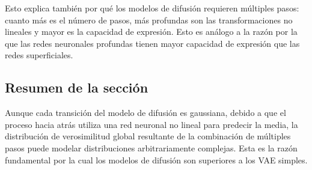 Esto explica también por qué los modelos de difusión requieren múltiples pasos: cuanto más es el número de pasos, más profundas son las transformaciones no lineales y mayor es la capacidad de expresión. Esto es análogo a la razón por la que las redes neuronales profundas tienen mayor capacidad de expresión que las redes superficiales.

\subsection{Resumen de la sección}

Aunque cada transición del modelo de difusión es gaussiana, debido a que el proceso hacia atrás utiliza una red neuronal no lineal para predecir la media, la distribución de verosimilitud global resultante de la combinación de múltiples pasos puede modelar distribuciones arbitrariamente complejas. Esta es la razón fundamental por la cual los modelos de difusión son superiores a los VAE simples.



